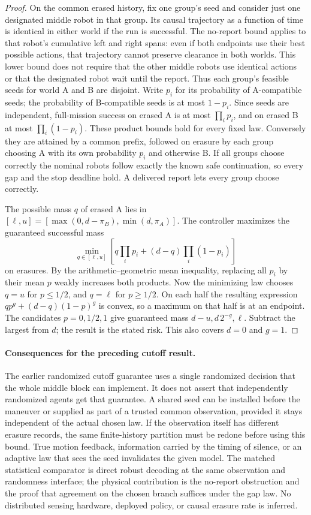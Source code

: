 \documentclass[11pt]{article}
\begin{document}
\begin{proof}
On the common erased history, fix one group's seed and consider just one designated middle robot in that group. Its causal trajectory as a function of time is identical in either world if the run is successful. The no-report bound applies to that robot's cumulative left and right spans: even if both endpoints use their best possible actions, that trajectory cannot preserve clearance in both worlds. This lower bound does not require that the other middle robots use identical actions or that the designated robot wait until the report. Thus each group's feasible seeds for world A and B are disjoint. Write $p_i$ for its probability of A-compatible seeds; the probability of B-compatible seeds is at most $1-p_i$. Since seeds are independent, full-mission success on erased A is at most $\prod_i p_i$, and on erased B at most $\prod_i(1-p_i)$. These product bounds hold for every fixed law. Conversely they are attained by a common prefix, followed on erasure by each group choosing A with its own probability $p_i$ and otherwise B. If all groups choose correctly the nominal robots follow exactly the known safe continuation, so every gap and the stop deadline hold. A delivered report lets every group choose correctly.

The possible mass $q$ of erased A lies in $[\ell,u]=[\max(0,d-\pi_B),\min(d,\pi_A)]$. The controller maximizes the guaranteed successful mass
\[
 \min_{q\in[\ell,u]}
 \left[q\prod_i p_i+(d-q)\prod_i(1-p_i)\right]
\]
on erasures. By the arithmetic--geometric mean inequality, replacing all $p_i$ by their mean $p$ weakly increases both products. Now the minimizing law chooses $q=u$ for $p\le1/2$, and $q=\ell$ for $p\ge1/2$. On each half the resulting expression $q p^g+(d-q)(1-p)^g$ is convex, so a maximum on that half is at an endpoint. The candidates $p=0,1/2,1$ give guaranteed mass $d-u,d\,2^{-g},\ell$. Subtract the largest from $d$; the result is the stated risk. This also covers $d=0$ and $g=1$.
\end{proof}

\paragraph{Consequences for the preceding cutoff result.}
The earlier randomized cutoff guarantee uses a single randomized decision that the whole middle block can implement. It does not assert that independently randomized agents get that guarantee. A shared seed can be installed before the maneuver or supplied as part of a trusted common observation, provided it stays independent of the actual chosen law. If the observation itself has different erasure records, the same finite-history partition must be redone before using this bound. True motion feedback, information carried by the timing of silence, or an adaptive law that sees the seed invalidates the given model. The matched statistical comparator is direct robust decoding at the same observation and randomness interface; the physical contribution is the no-report obstruction and the proof that agreement on the chosen branch suffices under the gap law. No distributed sensing hardware, deployed policy, or causal erasure rate is inferred.
\end{document}

